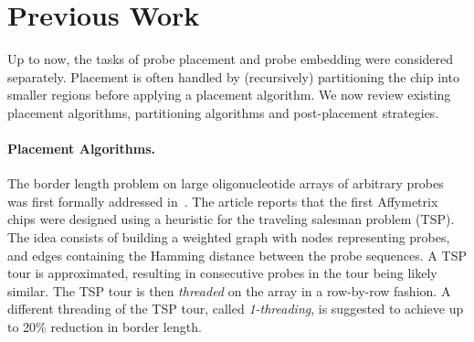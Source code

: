 \documentclass{llncs}
\newcommand{\ignore}[1]{}
\begin{document}
\section{Previous Work}
\label{sec:previous_work}

Up to now, the tasks of probe placement and probe embedding
were considered separately. Placement is often handled by
(recursively) partitioning the chip into smaller regions before applying a
placement algorithm. We now review existing placement algorithms, partitioning
algorithms and post-placement strategies.

\paragraph{Placement Algorithms.}
The border length problem on large oligonucleotide arrays of arbitrary probes
was first formally addressed in~\cite{HANNENHALLI02}. The article reports that
the first Affymetrix chips were designed using a heuristic for the traveling
salesman problem (TSP). The idea consists of building a weighted graph with
nodes representing probes, and edges containing the Hamming distance between
the probe sequences. A TSP tour is approximated, resulting in consecutive
probes in the tour being likely similar. The TSP tour is then \emph{threaded}
on the array in a row-by-row fashion.  A different threading of the TSP tour,
called \emph{1-threading}, is suggested to achieve up to 20\% reduction in
border length.

\ignore{ Kahng~{\it et~al}.~\cite{KAHNG02} propose the \emph{Epitaxial}
  placement algorithm that places a random probe in the center of the array
  and continues to insert probes in spots adjacent to already filled spots,
  employing a greedy heuristic to select the next spot to be filled and the
  probe that is assigned to it. Priority is given to spots whose neighbors are
  already filled, in which case the algorithm places the probe with minimum
  sum of Hamming distances to its neighbors. If no such a spot exists, the
  algorithm examines all non-filled spots~$s_i$ with $n_i \geq 1$ filled
  neighbors and finds a non-assigned probe $p_j$ with minimum sum of Hamming
  distances to the neighboring probes $H_{ij}$. For each possible assignment
  of $p_j$ to $s_i$, it computes a cost $c(s_i,p_j) := k_{n_i} H_{ij} / n$,
  where $k_{n_i}$ are scaling coefficients ($k_1 = 1$, $k_2 = 0.8$, and $k_3 =
  0.6$), and makes the assignment with minimum cost. With this algorithm, they
  claimed to achieve up to 10\% reduction in border conflicts over the
  TSP-based approach of Hannenhalli~{\it et~al}.\ \cite{HANNENHALLI02}.
%  
}
\end{document}
